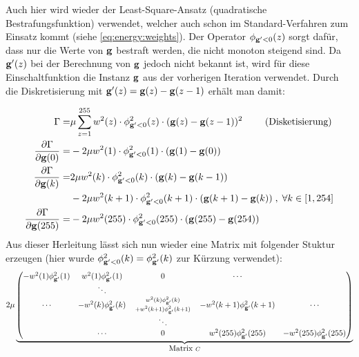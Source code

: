 Auch hier wird wieder der Least-Square-Ansatz (quadratische Bestrafungsfunktion) verwendet, welcher auch schon im Standard-Verfahren zum Einsatz kommt (siehe \autoref{eq:energy:weights}). Der Operator $\phi_{\mathbf g'<0} (z)$ sorgt dafür, dass nur die Werte von $\mathbf g$ bestraft werden, die nicht monoton steigend sind. Da $\mathbf g'(z)$ bei der Berechnung von $\mathbf g$ jedoch nicht bekannt ist, wird für diese Einschaltfunktion die Instanz $\mathbf g$ aus der vorherigen Iteration verwendet. Durch die Diskretisierung mit $\mathbf g'(z) = \mathbf g(z)-\mathbf g(z-1)$ erhält man damit:

\begin{align}
\Gamma = & \mu \sum_{z=1}^{255} w^2(z) \cdot \phi^2_{\mathbf g'<0}(z) \cdot (\mathbf g(z)- \mathbf g(z-1))^2 \qquad \mbox{ (Disketisierung)}\\
\label{eq:mon:diskret}
\frac{\partial \Gamma}{\partial \mathbf g(0)} =& -2\mu w^2(1) \cdot \phi^2_{\mathbf g'<0}(1)\cdot(\mathbf g(1)-\mathbf g(0))\\\frac{\partial \Gamma}{\partial \mathbf g(k)} 
        =& 2\mu w^2(k) \cdot \phi^2_{\mathbf g'<0}(k)\cdot(\mathbf g(k)-\mathbf g(k-1)) \nonumber \\
         &- 2 \mu w^2(k+1) \cdot \phi^2_{\mathbf g'<0}(k+1)\cdot(\mathbf g(k+1)-\mathbf g(k))
        \; , \; \forall k \in [1,254]\\
\frac{\partial \Gamma}{\partial \mathbf g(255)} =& -2\mu w^2(255) \cdot \phi^2_{\mathbf g'<0}(255)\cdot(\mathbf g(255)-\mathbf g(254))
\end{align}
Aus dieser Herleitung lässt sich nun wieder eine Matrix mit folgender Stuktur erzeugen (hier wurde $\phi^2_{\mathbf g'<0}(k) = \phi^2_{\mathbf g'}(k)$ zur Kürzung verwendet):
\small
\begin{align}
2\mu 
\underbrace{\begin{pmatrix}
-w^2(1)\phi^2_{\mathbf g'}(1) &w^2(1)\phi^2_{\mathbf g'}(1) & 0 & \cdots\\
& \ddots\\
\cdots & -w^2(k)\phi^2_{\mathbf g'}(k) & 
\begin{smallmatrix}
w^2(k)\phi^2_{\mathbf g'}(k) \\+ w^2(k+1)\phi^2_{\mathbf g'}(k+1)
\end{smallmatrix}
 & -w^2(k+1)\phi^2_{\mathbf g'}(k+1) & \cdots \\
& & \ddots\\
& \cdots &  0 & w^2(255)\phi^2_{\mathbf g'}(255) & - w^2(255)\phi^2_{\mathbf g'}(255) \\
\end{pmatrix}}_{\mbox{Matrix } C}
\end{align}
\normalsize

